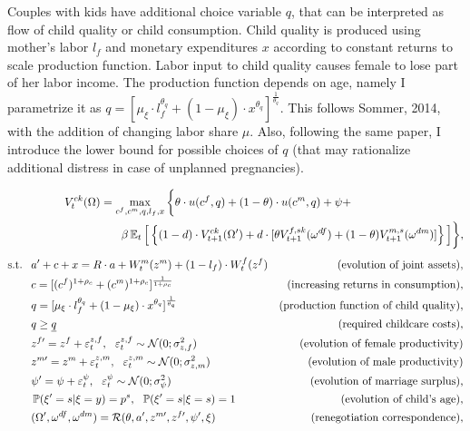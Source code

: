 Couples with kids have additional choice variable $q$, that can be interpreted as flow of child quality or child consumption. Child quality is produced using mother's labor $l_f$ and monetary expenditures $x$ according to constant returns to scale production function. Labor input to child quality causes female to lose part of her labor income. The production function depends on age, namely I parametrize it as $q = [\mu_\xi\cdot l_f^{\theta_q} + (1-\mu_\xi)\cdot x^{\theta_q}]^{\frac1{\theta_q}}$. This follows Sommer, 2014, with the addition of changing labor share $\mu$. Also, following the same paper, I introduce the lower bound for possible choices of $q$ (that may rationalize additional distress in case of unplanned pregnancies).

\begin{align}& \hspace{5em}  V^{ck}_t(\Omega) = \max\limits_{c^f,c^m,q,l_f,x}  \bigg\{ \theta\cdot u(c^f,q) + (1-\theta)\cdot u(c^m,q) + \psi + \label{vf_ck} \\  \nonumber
 & \hspace{10em} \beta \E_t \Big[   \left\{ (1-d)\cdot   V^{ck}_{t+1}(\Omega') + d\cdot [ \theta V_{t+1}^{f,sk}(\omega^{df}) + (1-\theta)V_{t+1}^{m,s}(\omega^{dm})]\right\} \Big] \bigg\},
\end{align}\vspace{-2em}
\begin{align*}
\text{s.t. \ } & a' + c + x = R\cdot a  + W^m_t(z^m) + (1-l_f)\cdot W^f_t(z^f) & \text{(evolution of joint assets)},\\
                    & c = [(c^f)^{1+\rho_c} + (c^m)^{1+\rho_c}]^{\frac1{1+\rho_c}} & \text{(increasing returns in consumption)},\\
                    & q = [\mu_\xi\cdot l_f^{\theta_q} + (1-\mu_\xi)\cdot x^{\theta_q}]^{\frac1{\theta_q}} & \text{(production function of child quality)},\\
                    & q \geq \underline{q} & \text{(required childcare costs)},\\
                    &  z^{f\prime} = z^f + \varepsilon^{z,f}_t, \ \ \varepsilon^{z,f}_t \sim \mathcal{N}(0;\sigma_{z,f}^2) &  \text{ (evolution of female productivity)}\\
				 &  z^{m\prime} = z^m + \varepsilon^{z,m}_t, \ \ \varepsilon^{z,m}_t \sim \mathcal{N}(0;\sigma_{z,m}^2) &  \text{ (evolution of male productivity)}\\
                    & \psi' = \psi + \varepsilon^{\psi}_t, \ \ \varepsilon^{\psi}_t \sim \mathcal{N}(0;\sigma_{\psi}^2)  & \text{(evolution of marriage surplus),} \\
                   &  \P(\xi' = s | \xi = y) = p^s, \ \ \P(\xi' = s | \xi = s) = 1 & \text{(evolution of child's age)},\\
                    & (\Omega',\omega^{df},\omega^{dm}) = \mathcal{R}(\theta,a',z^{m\prime},z^{f\prime},\psi',\xi) & \text{(renegotiation correspondence)},
\end{align*}

